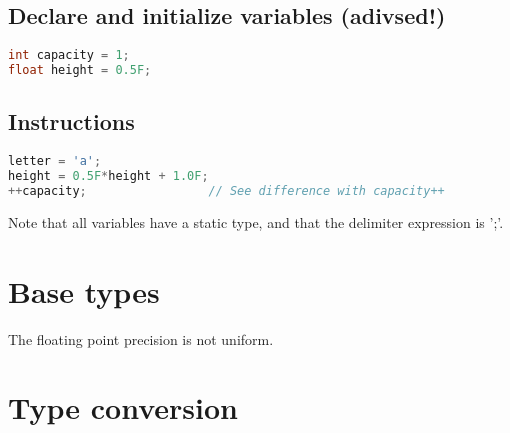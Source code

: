 \documentclass[11pt]{article}
\begin{document}
    \subsection{Declare and initialize variables (adivsed!)}
    \begin{lstlisting}[language=C]
int capacity = 1;
float height = 0.5F;
    \end{lstlisting}

    \subsection{Instructions}
    \begin{lstlisting}[language=C]
letter = 'a';
height = 0.5F*height + 1.0F;
++capacity;                 // See difference with capacity++
    \end{lstlisting}

    Note that all variables have a static type, and that the delimiter expression is ';'.

    \section{Base types}

    The floating point precision is not uniform.

    \section{Type conversion}
\end{document}
